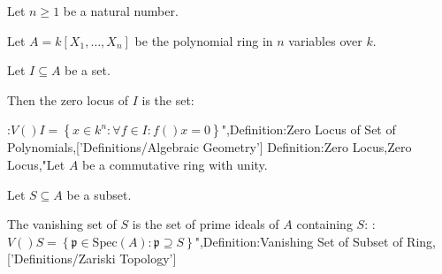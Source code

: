 Let $n\geq1$ be a natural number.

Let $A = k \left[ X_1, \ldots, X_n \right]$ be the polynomial ring in $n$ variables over $k$.

Let $I \subseteq A$ be a set.


Then the zero locus of $I$ is the set:

:$V \left(   \right)I = \left\lbrace x \in k^n : \forall f \in I: f \left(   \right)x = 0 \right\rbrace$",Definition:Zero Locus of Set of Polynomials,['Definitions/Algebraic Geometry']
Definition:Zero Locus,Zero Locus,"Let $A$ be a commutative ring with unity.

Let $S \subseteq A$ be a subset.


The vanishing set of $S$ is the set of prime ideals of $A$ containing $S$:
:$V \left(   \right)S = \left\lbrace \mathfrak p \in \mathrm {Spec} \left( A \right): \mathfrak p \supseteq S \right\rbrace$",Definition:Vanishing Set of Subset of Ring,['Definitions/Zariski Topology']
